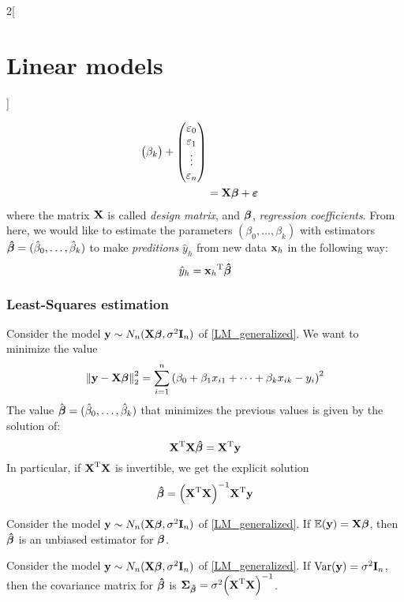 \documentclass[../../../main_math.tex]{subfiles}
\begin{document}
\begin{multicols}{2}[\section{Linear models}]
\begin{definition}
\begin{align}
\begin{pmatrix}
                     \beta_k \\
                   \end{pmatrix}+
      \begin{pmatrix}
        \varepsilon_0 \\
        \varepsilon_1 \\
        \vdots        \\
        \varepsilon_n \\
      \end{pmatrix}                                                \\
      \label{LM_generalized}   & =\boldsymbol{\mathrm{X}}\boldsymbol{\mathrm{\beta}}+\boldsymbol{\mathrm{\varepsilon}}
    \end{align}
    where the matrix $\boldsymbol{\mathrm{X}}$ is called \emph{design matrix}, and $\boldsymbol{\mathrm{\beta}}$, \emph{regression coefficients}. From here, we would like to estimate the parameters $(\beta_0,\ldots,\beta_k)$ with estimators $\boldsymbol{\mathrm{\hat\beta}}=(\hat\beta_0,\ldots,\hat\beta_k)$ to make \emph{preditions} $\hat{y}_h$ from new data $\boldsymbol{\mathrm{x}}_h$ in the following way: $$\hat{y}_h={\boldsymbol{\mathrm{x}}_h}^{\mathrm{T}}\boldsymbol{\mathrm{\hat\beta}}$$
  \end{definition}
  \subsubsection{Least-Squares estimation}
  \begin{proposition}
    Consider the model $\boldsymbol{\mathrm{y}}\sim N_n(\boldsymbol{\mathrm{X\beta}},\sigma^2\boldsymbol{\mathrm{I}}_n)$ of \cref{LM_generalized}. We want to minimize the value $${\left\|\boldsymbol{\mathrm{y}}-\boldsymbol{\mathrm{X\beta}}\right\|}_2^2=\sum_{i=1}^n{\left(\beta_0+\beta_1x_{i1}+\cdots+\beta_kx_{ik}-y_i\right)}^2$$
    The value $\hat{\boldsymbol{\mathrm{\beta}}}=(\hat\beta_0,\ldots,\hat\beta_k)$ that minimizes the previous values is given by the solution of: $${\boldsymbol{\mathrm{X}}}^{\mathrm{T}}\boldsymbol{\mathrm{X\hat\beta}}={\boldsymbol{\mathrm{X}}}^{\mathrm{T}}\boldsymbol{\mathrm{y}}$$
    In particular, if ${\boldsymbol{\mathrm{X}}}^{\mathrm{T}}\boldsymbol{\mathrm{X}}$ is invertible, we get the explicit solution $$\boldsymbol{\mathrm{\hat\beta}}={\left({\boldsymbol{\mathrm{X}}}^{\mathrm{T}}\boldsymbol{\mathrm{X}}\right)}^{-1}{\boldsymbol{\mathrm{X}}}^{\mathrm{T}}\boldsymbol{\mathrm{y}}$$
  \end{proposition}
  \begin{proposition}
    Consider the model $\boldsymbol{\mathrm{y}}\sim N_n(\boldsymbol{\mathrm{X\beta}},\sigma^2\boldsymbol{\mathrm{I}}_n)$ of \cref{LM_generalized}. If $\mathbb{E}(\boldsymbol{\mathrm{y}})=\boldsymbol{\mathrm{X\beta}}$, then $\boldsymbol{\mathrm{\hat\beta}}$ is an unbiased estimator for $\boldsymbol{\mathrm{\beta}}$.
  \end{proposition}
  \begin{proposition}
    Consider the model $\boldsymbol{\mathrm{y}}\sim N_n(\boldsymbol{\mathrm{X\beta}},\sigma^2\boldsymbol{\mathrm{I}}_n)$ of \cref{LM_generalized}. If $\mathrm{Var}(\boldsymbol{\mathrm{y}})=\sigma^2\boldsymbol{\mathrm{I}}_n$, then the covariance matrix for $\boldsymbol{\mathrm{\hat\beta}}$ is $\boldsymbol{\mathrm{\Sigma}}_{\boldsymbol{\mathrm{\hat\beta}}}=\sigma^2{\left({\boldsymbol{\mathrm{X}}}^{\mathrm{T}}\boldsymbol{\mathrm{X}}\right)}^{-1}$.
  \end{proposition}

\end{multicols}
\end{document}
